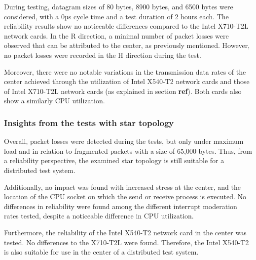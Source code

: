 \documentclass[11pt]{article}
\begin{document}
During testing, datagram sizes of 80 bytes, 8900 bytes, and 6500 bytes were considered, with a 0µs cycle time and a test duration of 2 hours each. The reliability results show no noticeable differences compared to the Intel X710-T2L network cards. In the R direction, a minimal number of packet losses were observed that can be attributed to the center, as previously mentioned. However, no packet losses were recorded in the H direction during the test.

Moreover, there were no notable variations in the transmission data rates of the center achieved through the utilization of Intel X540-T2 network cards and those of Intel X710-T2L network cards (as explained in section \textbf{ref}). Both cards also show a similarly CPU utilization.


\subsubsection{Insights from the tests with star topology}

Overall, packet losses were detected during the tests, but only under maximum load and in relation to fragmented packets with a size of 65,000 bytes. Thus, from a reliability perspective, the examined star topology is still suitable for a distributed test system.

Additionally, no impact was found with increased stress at the center, and the location of the CPU socket on which the send or receive process is executed. No differences in reliability were found among the different interrupt moderation rates tested, despite a noticeable difference in CPU utilization.

Furthermore, the reliability of the Intel X540-T2 network card in the center was tested. No differences to the X710-T2L were found. Therefore, the Intel X540-T2 is also suitable for use in the center of a distributed test system.
\end{document}
